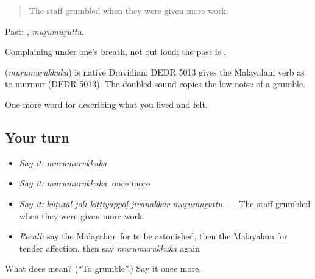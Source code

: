 \begin{quote}
The staff grumbled when they were given more work.
\end{quote}

Past: , \emph{muṟumuṟuttu}.

Complaining under one's breath, not out loud; the past is .

\begin{cousinweb}
\textbf{} (\emph{muṟumuṟukkuka}) is native Dravidian: DEDR 5013 gives the Malayalam verb as to murmur (DEDR 5013). The doubled sound copies the low noise of a grumble.
\end{cousinweb}

\begin{grammarlens}[title={What you've built}]
One more word for describing what you lived and felt.
\end{grammarlens}

\subsection*{Your turn}
\begin{itemize}
\raggedright
  \item \emph{Say it:} \emph{muṟumuṟukkuka}
  \item \emph{Say it:} \emph{muṟumuṟukkuka}, once more
  \item \emph{Say it:} \emph{kūṭutal jōli kiṭṭiyappōḷ jīvanakkār muṟumuṟuttu.} — The staff grumbled when they were given more work.
  \item \emph{Recall:} say the Malayalam for to be astonished, then the Malayalam for tender affection, then say \emph{muṟumuṟukkuka} again
\end{itemize}

\begin{tcolorbox}[breakable,colback=teal!4,colframe=teal!35!black,title={Before you move on}]
What does  mean? (\textquotedblleft{}To grumble\textquotedblright{}.) Say it once more.
\end{tcolorbox}
